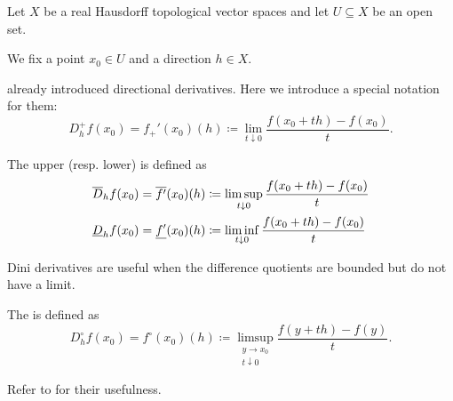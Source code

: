 \begin{definition}\label{def:nonsmooth_derivatives}
  Let \( X \) be a real Hausdorff topological vector spaces and let \( U \subseteq X \) be an open set.

  We fix a point \( x_0 \in U \) and a direction \( h \in X \).

  \begin{defenum}
     already introduced directional derivatives. Here we introduce a special notation for them:
    \begin{equation*}
      D_h^+ f(x_0) = f_+'(x_0)(h) \coloneqq \lim_{t \downarrow 0} \frac {f(x_0 + th) - f(x_0)} t.
    \end{equation*}

    \cite[definition 11.18]{Clarke2013} The upper (resp. lower)  is defined as
    \begin{align*}
      \overline{D}_h f(x_0) = \overline{f'}(x_0)(h) &\coloneqq \limsup_{t \downarrow 0} \frac {f(x_0 + th) - f(x_0)} t
      \\
      \underline{D}_h f(x_0) = \underline{f'}(x_0)(h) &\coloneqq \liminf_{t \downarrow 0} \frac {f(x_0 + th) - f(x_0)} t
    \end{align*}

    Dini derivatives are useful when the difference quotients are bounded but do not have a limit.

    \cite[section 10.1]{Clarke2013} The  is defined as
    \begin{equation*}
      D_h^\circ f(x_0)
      =
      f^\circ(x_0)(h)
      \coloneqq
      \limsup_{\substack{y \to x_0 \\ t \downarrow 0}} \frac {f(y + th) - f(y)} t.
    \end{equation*}

    Refer to  for their usefulness.
  \end{defenum}
\end{definition}
